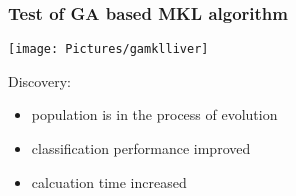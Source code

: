 \documentclass{beamer}
\begin{document}
	\begin{frame}
		\frametitle{Test of GA based MKL algorithm}
		\begin{minipage}{0.45\textwidth}
			\begin{table}[!ht]
				\centering
			\end{table}
			\texttt{[image: Pictures/gamklliver]}
		\end{minipage}\hfill
		\pause
		\begin{minipage}{0.45\textwidth}
			Discovery:
			\begin{itemize}
				\item population is in the process of evolution
				\item classification performance improved
				\item calcuation time increased
			\end{itemize}
		\end{minipage}
	\end{frame}
	
\end{document}
